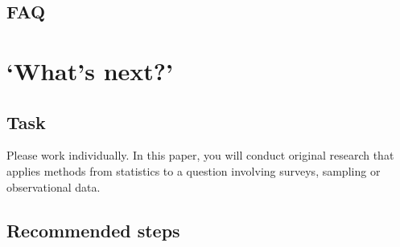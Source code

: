 \documentclass[
]{book}
\begin{document}
\hypertarget{faq-6}{%
\subsection{FAQ}\label{faq-6}}

\hypertarget{whats-next}{%
\section{`What's next?'}\label{whats-next}}

\hypertarget{task-7}{%
\subsection{Task}\label{task-7}}

Please work individually. In this paper, you will conduct original research that applies methods from statistics to a question involving surveys, sampling or observational data.

\hypertarget{recommended-steps-3}{%
\subsection{Recommended steps}\label{recommended-steps-3}}
\end{document}
